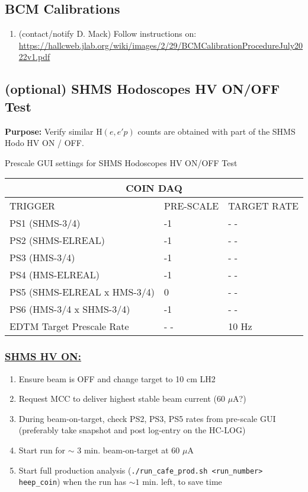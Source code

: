 \documentclass{article}
\begin{document}
\subsection{BCM Calibrations}
\begin{enumerate}
    \item (contact/notify D. Mack) Follow instructions on: \\ \url{https://hallcweb.jlab.org/wiki/images/2/29/BCMCalibrationProcedureJuly2022v1.pdf}
    
\end{enumerate}
\subsection{(optional) SHMS Hodoscopes HV ON/OFF Test}
\textbf{Purpose:} Verify similar H$(e,e'p)$ counts are obtained with part of the
SHMS Hodo HV ON / OFF. \\
 \begin{center}
  Prescale GUI settings for SHMS Hodoscopes HV ON/OFF Test
    \begin{tabular}{ |p{6cm}| |p{3cm}| |p{3cm}| }
    \hline
    \multicolumn{3}{|c|}{COIN DAQ} \\
    \hline
    TRIGGER & PRE-SCALE & TARGET RATE\\
    \hline
    PS1 (SHMS-3/4)    & -1  & - - \\
    PS2 (SHMS-ELREAL) & -1  & - - \\
    PS3 (HMS-3/4)     & -1  & - -\\
    PS4 (HMS-ELREAL)  & -1  & - - \\
    PS5 (SHMS-ELREAL x HMS-3/4)  & 0 & - -  \\
    PS6 (HMS-3/4 x SHMS-3/4)     & -1 & - -  \\
    \hline
    EDTM Target Prescale Rate & - - & 10 Hz \\
    \hline
    \end{tabular}
    \end{center}
 \subsubsection*{\underline{SHMS HV ON:}}
 \begin{enumerate}
    \item Ensure beam is OFF and change target to 10 cm LH2
    \item Request MCC to deliver highest stable beam current (60 $\mu$A?)
    \item During beam-on-target, check PS2, PS3, PS5 rates from pre-scale GUI (preferably take snapshot and post log-entry on the HC-LOG)
    \item Start run for $\sim$ 3  min. beam-on-target at 60 $\mu$A 
    \item Start full production analysis (\texttt{./run\_cafe\_prod.sh <run\_number> heep\_coin})
    when the run has $\sim 1$ min. left, to save time
\end{enumerate}
\end{document}
